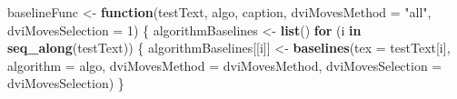 \documentclass[]{article}
\newenvironment{Shaded}{\begin{snugshade}}{\end{snugshade}}
\newcommand{\KeywordTok}[1]{\textcolor[rgb]{0.13,0.29,0.53}{\textbf{#1}}}
\newcommand{\DataTypeTok}[1]{\textcolor[rgb]{0.13,0.29,0.53}{#1}}
\newcommand{\DecValTok}[1]{\textcolor[rgb]{0.00,0.00,0.81}{#1}}
\newcommand{\StringTok}[1]{\textcolor[rgb]{0.31,0.60,0.02}{#1}}
\newcommand{\ControlFlowTok}[1]{\textcolor[rgb]{0.13,0.29,0.53}{\textbf{#1}}}
\newcommand{\NormalTok}[1]{#1}
\begin{document}
\begin{Shaded}
\begin{Highlighting}[]
\NormalTok{baselineFunc <-}\StringTok{ }\ControlFlowTok{function}\NormalTok{(testText, }
\NormalTok{                         algo, }
\NormalTok{                         caption, }
                         \DataTypeTok{dviMovesMethod =} \StringTok{"all"}\NormalTok{, }
                         \DataTypeTok{dviMovesSelection =} \DecValTok{1}\NormalTok{) \{}
\NormalTok{  algorithmBaselines <-}\StringTok{ }\KeywordTok{list}\NormalTok{()}
  \ControlFlowTok{for}\NormalTok{ (i }\ControlFlowTok{in} \KeywordTok{seq_along}\NormalTok{(testText)) \{}
\NormalTok{    algorithmBaselines[[i]] <-}\StringTok{ }\KeywordTok{baselines}\NormalTok{(}\DataTypeTok{tex =}\NormalTok{ testText[i],}
                                         \DataTypeTok{algorithm =}\NormalTok{ algo,}
                                         \DataTypeTok{dviMovesMethod =}\NormalTok{ dviMovesMethod,}
                                         \DataTypeTok{dviMovesSelection =}\NormalTok{ dviMovesSelection)}
\NormalTok{  \}}
  

\end{Highlighting}
\end{Shaded}
\end{document}
